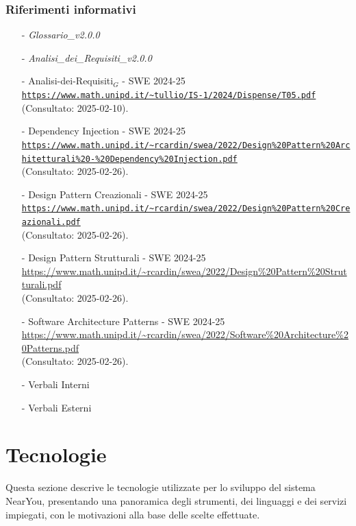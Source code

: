 \documentclass[10pt]{article}
\begin{document}
\subsubsection{Riferimenti informativi}
\begin{itemize}
    \item[-] \textit{Glossario\_v2.0.0}
    \item[-] \textit{Analisi\_dei\_Requisiti\_v2.0.0}
    \item[-] Analisi-dei-Requisiti$_G$ - SWE 2024-25\\
    \textcolor{blue}{\texttt{\url{https://www.math.unipd.it/\~tullio/IS-1/2024/Dispense/T05.pdf}}}\\ (Consultato: 2025-02-10).

    \item[-] Dependency Injection - SWE 2024-25\\
    \textcolor{blue}{\texttt{\url{https://www.math.unipd.it/\~rcardin/swea/2022/Design\%20Pattern\%20Architetturali\%20-\%20Dependency\%20Injection.pdf}}}\\ (Consultato: 2025-02-26).

    \item[-] Design Pattern Creazionali - SWE 2024-25\\
    \textcolor{blue}{\texttt{\url{https://www.math.unipd.it/\~rcardin/swea/2022/Design\%20Pattern\%20Creazionali.pdf}}}\\ (Consultato: 2025-02-26).

    \item[-] Design Pattern Strutturali - SWE 2024-25\\
    \textcolor{blue}{\url{https://www.math.unipd.it/\~rcardin/swea/2022/Design\%20Pattern\%20Strutturali.pdf}}\\ (Consultato: 2025-02-26).

    \item[-] Software Architecture Patterns - SWE 2024-25\\
    \textcolor{blue}{\url{https://www.math.unipd.it/\~rcardin/swea/2022/Software\%20Architecture\%20Patterns.pdf}}\\ (Consultato: 2025-02-26).

    \item[-] Verbali Interni
    \item[-] Verbali Esterni
\end{itemize}


\section{Tecnologie}
Questa sezione descrive le tecnologie utilizzate per lo sviluppo del sistema NearYou, presentando una panoramica degli strumenti, dei linguaggi e dei servizi impiegati, con le motivazioni alla base delle scelte effettuate.
\end{document}

